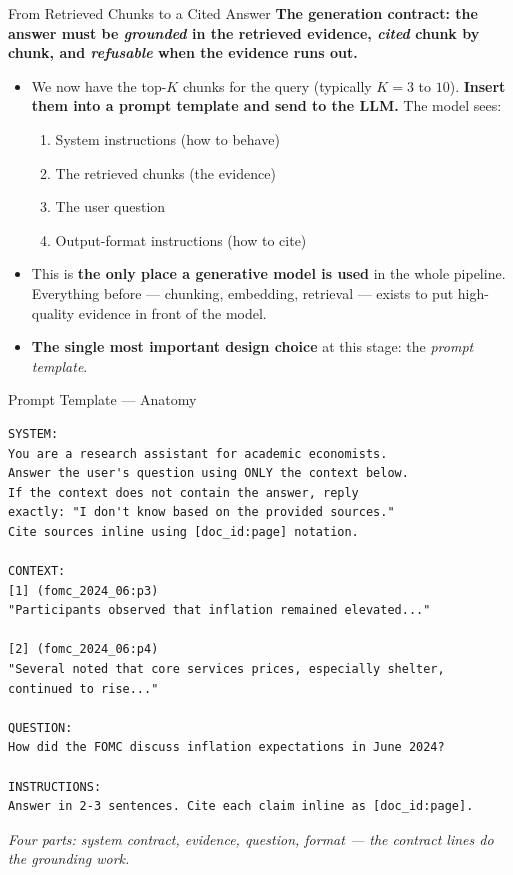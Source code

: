 \begin{frame}{From Retrieved Chunks to a Cited Answer}
\textbf{The generation contract: the answer must be \emph{grounded} in the retrieved evidence, \emph{cited} chunk by chunk, and \emph{refusable} when the evidence runs out.}

\medskip
\begin{itemize}
\item We now have the top-$K$ chunks for the query (typically $K = 3$ to $10$). \textbf{Insert them into a prompt template and send to the LLM.} The model sees:
\begin{enumerate}
    \item System instructions (how to behave)
    \item The retrieved chunks (the evidence)
    \item The user question
    \item Output-format instructions (how to cite)
\end{enumerate}

\medskip
\item This is \textbf{the only place a generative model is used} in the whole pipeline. Everything before --- chunking, embedding, retrieval --- exists to put high-quality evidence in front of the model.

\medskip
\item \textbf{The single most important design choice} at this stage: the \emph{prompt template}.
\end{itemize}
\end{frame}

\begin{frame}[fragile]{Prompt Template --- Anatomy}
\begin{lstlisting}[basicstyle=\ttfamily\scriptsize]
SYSTEM:
You are a research assistant for academic economists.
Answer the user's question using ONLY the context below.
If the context does not contain the answer, reply
exactly: "I don't know based on the provided sources."
Cite sources inline using [doc_id:page] notation.

CONTEXT:
[1] (fomc_2024_06:p3)
"Participants observed that inflation remained elevated..."

[2] (fomc_2024_06:p4)
"Several noted that core services prices, especially shelter,
continued to rise..."

QUESTION:
How did the FOMC discuss inflation expectations in June 2024?

INSTRUCTIONS:
Answer in 2-3 sentences. Cite each claim inline as [doc_id:page].
\end{lstlisting}
\textit{\footnotesize Four parts: system contract, evidence, question, format --- the contract lines do the grounding work.}
\end{frame}


